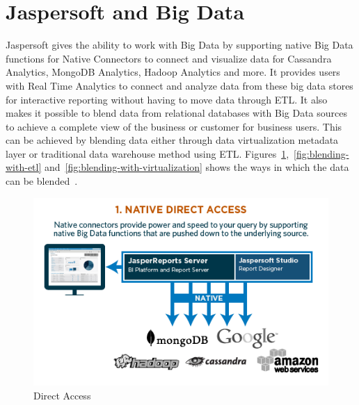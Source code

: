 \section{Jaspersoft and Big Data}
Jaspersoft gives the ability to work with Big Data by supporting native Big Data
functions for Native Connectors to connect and visualize data for Cassandra
Analytics, MongoDB Analytics, Hadoop Analytics and more. It provides users with
Real Time Analytics to connect and analyze data from these big data stores for
interactive reporting without having to move data through ETL. It also makes it
possible to blend data from relational databases with Big Data sources to
achieve a complete view of the business or customer for business users. This can
be achieved by blending data either through data virtualization metadata layer
or traditional data warehouse method using ETL.
Figures~\ref{fig:native-direct-access},~\ref{fig:blending-with-etl}
and~\ref{fig:blending-with-virtualization} shows the ways in which the data can
be blended~\cite{hid-sp18-516-www-jaspersoft-big-data}. 

\begin{figure}[!ht]
        \centering\includegraphics[width=\columnwidth]{../images/native-direct-access.png}
        \caption{Direct Access~\cite{hid-sp18-516-www-jaspersoft-big-data}}
        \label{fig:native-direct-access}
\end{figure}

